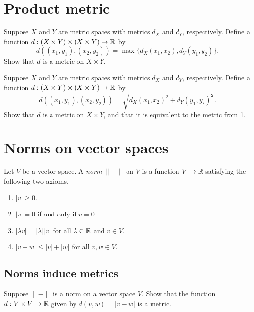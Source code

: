 \section{Product metric} \label{product-metric}

\begin{exercise}
	Suppose $X$ and $Y$ are metric spaces with metrics $d_X$ and $d_Y$, respectively. Define a function $d : (X \times Y) \times (X \times Y) \to \mathbb{R}$ by 
	\[ d((x_1,y_1),(x_2,y_2)) = \max\{ d_X(x_1,x_2), d_Y(y_1,y_2) \}. \]
	Show that $d$ is a metric on $X \times Y$. 
\end{exercise}

\begin{exercise}
	Suppose $X$ and $Y$ are metric spaces with metrics $d_X$ and $d_Y$, respectively. Define a function $d : (X \times Y) \times (X \times Y) \to \mathbb{R}$ by 
	\[ d((x_1,y_1),(x_2,y_2)) = \sqrt{ d_X(x_1,x_2)^2 + d_Y(y_1,y_2)^2 }. \]
	Show that $d$ is a metric on $X \times Y$, and that it is equivalent to the metric from \cref{product-metric}. 
\end{exercise}

\section{Norms on vector spaces}

\begin{definition} \label{norm-definition} 
	Let $V$ be a vector space. A \emph{norm} $\|-\|$ on $V$ is a function $V \to \mathbb{R}$ satisfying the following two axioms. 
	\begin{enumerate}[(N1)]
		\item $|v| \geq 0$.
		\item $|v| = 0$ if and only if $v = 0$. 
		\item $|\lambda v| = |\lambda| |v|$ for all $\lambda \in \mathbb{R}$ and $v \in V$. 
		\item $|v + w| \leq |v| + |w|$ for all $v, w \in V$.
	\end{enumerate}
\end{definition}

\subsection{Norms induce metrics}

\begin{exercise} \label{norm-induces-metric}
	Suppose $\|-\|$ is a norm on a vector space $V$. Show that the function $d : V \times V \to \mathbb{R}$ given by $d(v, w) = |v-w|$ is a metric. 
\end{exercise}

